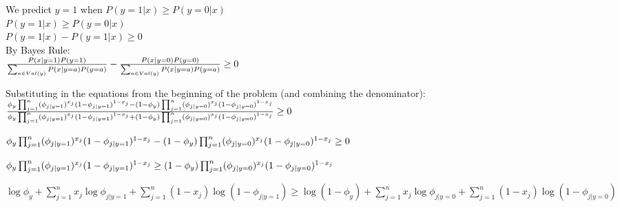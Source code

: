 \documentclass[11pt]{article}
\begin{document}
We predict $y=1$ when $P(y=1|x) \geq P(y=0|x)$ \\

$P(y=1|x) \geq P(y=0|x)$ \\

$P(y=1|x) - P(y=1|x) \geq 0$ \\

By Bayes Rule: \\

$\frac{P(x|y=1)P(y=1)}{\sum_{a \in Val(y)} P(x|y=a)P(y=a)} - \frac{P(x|y=0)P(y=0)}{\sum_{a \in Val(y)} P(x|y=a)P(y=a)} \geq 0 \\\\\\$

Substituting in the equations from the beginning of the problem (and combining the denominator): \\

$\frac{\phi_y \prod_{j=1}^n (\phi_{j|y=1})^{x_j} (1 - \phi_{j|y=1})^{1-x_j} - (1 - \phi_y) \prod_{j=1}^n (\phi_{j|y=0})^{x_j} (1 - \phi_{j|y=0})^{1 - x_j}}{\phi_y \prod_{j=1}^n (\phi_{j|y=1})^{x_j}(1 - \phi_{j|y=1})^{1-x_j} + (1 - \phi_y) \prod_{j=1}^n (\phi_{j|y=0})^{x_j}(1-\phi_{j|y=0})^{1-x_j}} \geq 0 \\\\\\$ 

$\phi_y \prod_{j=1}^n (\phi_{j|y=1})^{x_j} (1 - \phi_{j|y=1})^{1-x_j} - (1 - \phi_y) \prod_{j=1}^n (\phi_{j|y=0})^{x_j} (1 - \phi_{j|y=0})^{1 - x_j} \geq 0 \\$ 

$\phi_y \prod_{j=1}^n (\phi_{j|y=1})^{x_j} (1 - \phi_{j|y=1})^{1-x_j} \geq (1 - \phi_y) \prod_{j=1}^n (\phi_{j|y=0})^{x_j} (1 - \phi_{j|y=0})^{1 - x_j} \\$

$\log \phi_y + \sum_{j=1}^n x_j \log \phi_{j|y=1} + \sum_{j=1}^n (1-x_j) \log (1 - \phi_{j|y=1}) \geq \log (1 - \phi_y) + \sum_{j=1}^n x_j \log \phi_{j|y=0} + \sum_{j=1}^n (1-x_j) \log (1 - \phi_{j|y=0})$
\end{document}
